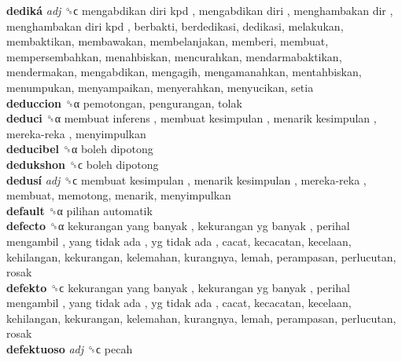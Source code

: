 \textbf{dediká} \emph{adj}  ␝ϲ   mengabdikan diri kpd ,  mengabdikan diri ,  menghambakan dir ,  menghambakan diri kpd , berbakti, berdedikasi, dedikasi, melakukan, membaktikan, membawakan, membelanjakan, memberi, membuat, mempersembahkan, menahbiskan, mencurahkan, mendarmabaktikan, mendermakan, mengabdikan, mengagih, mengamanahkan, mentahbiskan, menumpukan, menyampaikan, menyerahkan, menyucikan, setia  \\
\textbf{deduccion} ␝α  pemotongan, pengurangan, tolak  \\
\textbf{deduci} ␝α   membuat inferens ,  membuat kesimpulan ,  menarik kesimpulan ,  mereka-reka , menyimpulkan  \\
\textbf{deducibel} ␝α   boleh dipotong   \\
\textbf{dedukshon} ␝ϲ   boleh dipotong   \\
\textbf{dedusí} \emph{adj}  ␝ϲ   membuat kesimpulan ,  menarik kesimpulan ,  mereka-reka , membuat, memotong, menarik, menyimpulkan  \\
\textbf{default} ␝α   pilihan automatik   \\
\textbf{defecto} ␝α   kekurangan yang banyak ,  kekurangan yg banyak ,  perihal mengambil ,  yang tidak ada ,  yg tidak ada , cacat, kecacatan, kecelaan, kehilangan, kekurangan, kelemahan, kurangnya, lemah, perampasan, perlucutan, rosak  \\
\textbf{defekto} ␝ϲ   kekurangan yang banyak ,  kekurangan yg banyak ,  perihal mengambil ,  yang tidak ada ,  yg tidak ada , cacat, kecacatan, kecelaan, kehilangan, kekurangan, kelemahan, kurangnya, lemah, perampasan, perlucutan, rosak  \\
\textbf{defektuoso} \emph{adj}  ␝ϲ  pecah  \\
